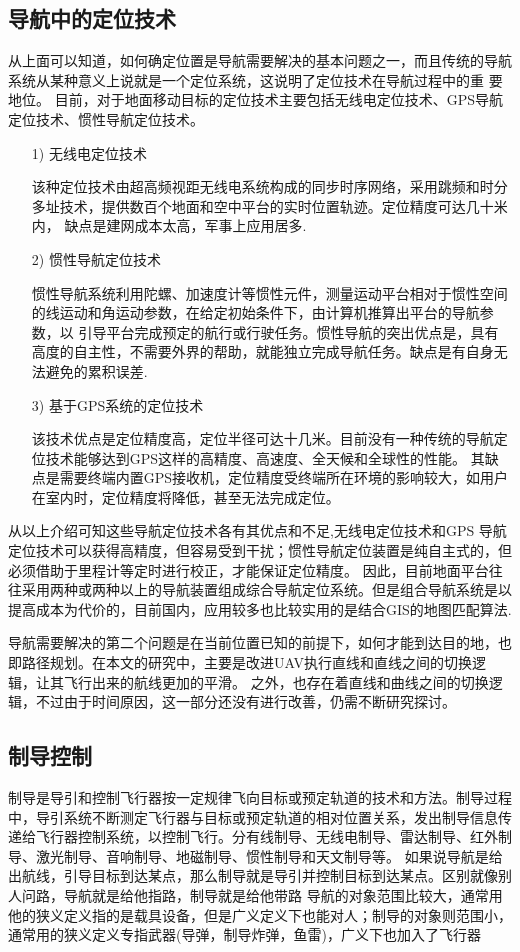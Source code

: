 \documentclass[UTF8,a4paper,10pt,nocolorlinks]{ctexart}
\begin{document}
\subsection{导航中的定位技术}
从上面可以知道，如何确定位置是导航需要解决的基本问题之一，而且传统的导航系统从某种意义上说就是一个定位系统，这说明了定位技术在导航过程中的重
要地位。
目前，对于地面移动目标的定位技术主要包括无线电定位技术、GPS导航定位技术、惯性导航定位技术。
\begin{itemize}
    \item [1)] 无线电定位技术 \par
        该种定位技术由超高频视距无线电系统构成的同步时序网络，采用跳频和时分
    多址技术，提供数百个地面和空中平台的实时位置轨迹。定位精度可达几十米内，
    缺点是建网成本太高，军事上应用居多.
    \item [2)] 惯性导航定位技术 \par
    惯性导航系统利用陀螺、加速度计等惯性元件，测量运动平台相对于惯性空间的线运动和角运动参数，在给定初始条件下，由计算机推算出平台的导航参数，以
    引导平台完成预定的航行或行驶任务。惯性导航的突出优点是，具有高度的自主性，不需要外界的帮助，就能独立完成导航任务。缺点是有自身无法避免的累积误差.
    \item [3)] 基于GPS系统的定位技术 \par
    该技术优点是定位精度高，定位半径可达十几米。目前没有一种传统的导航定位技术能够达到GPS这样的高精度、高速度、全天候和全球性的性能。
    其缺点是需要终端内置GPS接收机，定位精度受终端所在环境的影响较大，如用户在室内时，定位精度将降低，甚至无法完成定位。
\end{itemize}
\par 从以上介绍可知这些导航定位技术各有其优点和不足,无线电定位技术和GPS
导航定位技术可以获得高精度，但容易受到干扰；惯性导航定位装置是纯自主式的，但必须借助于里程计等定时进行校正，才能保证定位精度。
因此，目前地面平台往往采用两种或两种以上的导航装置组成综合导航定位系统。但是组合导航系统是以提高成本为代价的，目前国内，应用较多也比较实用的是结合GIS的地图匹配算法.
\par
导航需要解决的第二个问题是在当前位置已知的前提下，如何才能到达目的地，也即路径规划。在本文的研究中，主要是改进UAV执行直线和直线之间的切换逻辑，让其飞行出来的航线更加的平滑。
之外，也存在着直线和曲线之间的切换逻辑，不过由于时间原因，这一部分还没有进行改善，仍需不断研究探讨。
        \subsection{制导控制}
        制导是导引和控制飞行器按一定规律飞向目标或预定轨道的技术和方法。制导过程中，导引系统不断测定飞行器与目标或预定轨道的相对位置关系，发出制导信息传递给飞行器控制系统，以控制飞行。分有线制导、无线电制导、雷达制导、红外制导、激光制导、音响制导、地磁制导、惯性制导和天文制导等。
        如果说导航是给出航线，引导目标到达某点，那么制导就是导引并控制目标到达某点。区别就像别人问路，导航就是给他指路，制导就是给他带路
        导航的对象范围比较大，通常用他的狭义定义指的是载具设备，但是广义定义下也能对人；制导的对象则范围小，通常用的狭义定义专指武器(导弹，制导炸弹，鱼雷)，广义下也加入了飞行器
\end{document}
